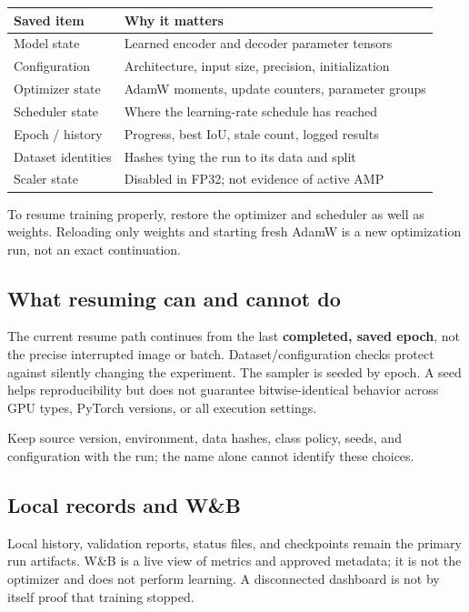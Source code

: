\documentclass[11pt,letterpaper]{article}
\newcommand{\code}[1]{\texttt{\detokenize{#1}}}
\begin{document}
\begin{tabularx}{\linewidth}{@{}lY@{}}\toprule
\textbf{Saved item} & \textbf{Why it matters}\\\midrule
Model state & Learned encoder and decoder parameter tensors\\
Configuration & Architecture, input size, precision, initialization\\
Optimizer state & AdamW moments, update counters, parameter groups\\
Scheduler state & Where the learning-rate schedule has reached\\
Epoch / history & Progress, best IoU, stale count, logged results\\
Dataset identities & Hashes tying the run to its data and split\\
Scaler state & Disabled in FP32; not evidence of active AMP\\\bottomrule
\end{tabularx}

To resume training properly, restore the optimizer and scheduler as well as weights. Reloading only weights and starting fresh AdamW is a new optimization run, not an exact continuation.

\subsection*{What resuming can and cannot do}
The current resume path continues from the last \textbf{completed, saved epoch}, not the precise interrupted image or batch. Dataset/configuration checks protect against silently changing the experiment. The sampler is seeded by epoch. A seed helps reproducibility but does not guarantee bitwise-identical behavior across GPU types, PyTorch versions, or all execution settings.

Keep source version, environment, data hashes, class policy, seeds, and configuration with the run; the name \code{5.C} alone cannot identify these choices.

\subsection*{Local records and W\&B}
Local history, validation reports, status files, and checkpoints remain the primary run artifacts. W\&B is a live view of metrics and approved metadata; it is not the optimizer and does not perform learning. A disconnected dashboard is not by itself proof that training stopped.
\end{document}
